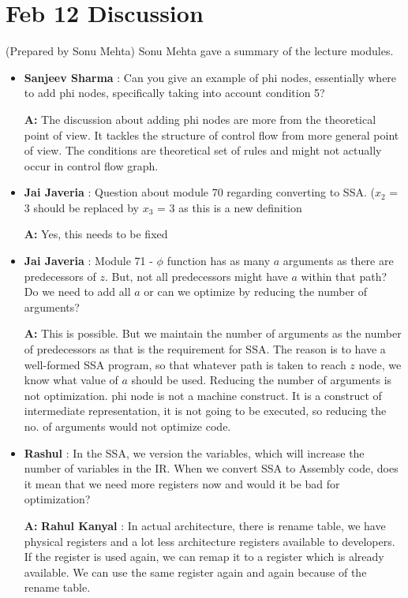 \section{Feb 12 Discussion}
(Prepared by Sonu Mehta)
Sonu Mehta gave a summary of the lecture modules.
\begin{itemize}
    \item \textbf{Sanjeev Sharma} : Can you give an example of phi nodes, essentially where to add phi nodes, specifically taking into account condition 5?
    
    \textbf{A:} The discussion about adding phi nodes are more from the theoretical point of view. It tackles the structure of control flow from more general point of view.
    The conditions are theoretical set of rules and might not actually occur in control flow graph.
    
    \item \textbf{Jai Javeria} : Question about module 70 regarding converting to SSA. ($x_2$ = 3 should be replaced by $x_3$ = 3 as this is a new definition 
    
    \textbf{A:} Yes, this needs to be fixed
    
    \item \textbf{Jai Javeria} : Module 71 - $\phi$ function has as many $a$ arguments as there are predecessors of $z$. But, not all predecessors might have $a$ within that path? Do we need to add all $a$ or can we optimize by reducing the number of arguments?
    
    \textbf{A:} This is possible. But we maintain the number of arguments as the number of predecessors as that is the requirement for SSA. The reason is to have a well-formed SSA program, so that whatever path is taken to reach $z$ node, we know what value of $a$ should be used.
    Reducing the number of arguments is not optimization. phi node is not a machine construct. It is a construct of intermediate representation, it is not going to be executed, so reducing the no. of arguments would not optimize code. 
    
    \item \textbf{Rashul} : In the SSA, we version the variables, which will increase the number of variables in the IR. When we convert SSA to Assembly code, does it mean that we need more registers now and would it be bad for optimization?
    
    \textbf{A:} 
    \textbf{Rahul Kanyal} : In actual architecture, there is rename table, we have physical registers and a lot less architecture registers available to developers. If the register is used again, we can remap it to a register which is already available. We can use the same register again and again because of the rename table.
    

\end{itemize}
